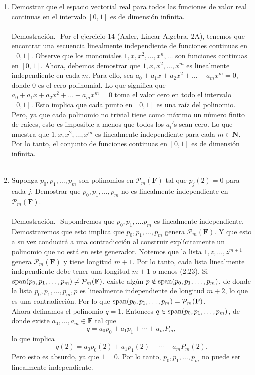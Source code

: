 \begin{enumerate}[\bfseries 1.]
    \item Demostrar que el espacio vectorial real para todos las funciones de valor real continuas en el intervalo $[0,1]$ es de dimensión infinita.\\\\
	Demostración.-\; Por el ejercicio 14 (Axler, Linear Algebra, 2A), tenemos que encontrar una secuencia linealmente independiente de funciones continuas en $[0,1]$. Observe que los monomiales $1,x,x^2,\ldots,x^n,\ldots$ son funciones continuas en $[0,1]$. Ahora, debemos demostrar que $1,x,x^2,\ldots,x^m$ es linealmente independiente en cada $m$. Para ello, sea $a_0+a_1x+a_2x^2+\ldots+a_mx^m=0$, donde $0$ es el cero polinomial. Lo que significa que $a_0+a_1x+a_2x^2+\ldots+a_mx^m=0$ toma el valor cero en todo el intervalo $[0,1]$. Esto implica que cada punto en $[0,1]$ es una raíz del polinomio. Pero, ya que cada polinomio no trivial tiene como máximo un número finito de raíces, esto es imposible a menos que todos los $a_i'$s sean cero. Lo que muestra que $1,x,x^2,\ldots,x^m$ es linealmente independiente para cada $m\in \textbf{N}$. Por lo tanto, el conjunto de funciones continuas en $[0,1]$ es de dimensión infinita.\\\\

    \item Suponga $p_0,p_1,\ldots,p_m$ son polinomios en $\mathcal{P}_m(\textbf{F})$ tal que $p_j(2)=0$ para cada $j$. Demostrar que $p_0,p_1,\ldots,p_m$ no es linealmente independiente en $\mathcal{P}_m(\textbf{F})$.\\\\
	Demostración.-\; Supondremos que $p_0,p_1,\ldots.p_m$ es linealmente independiente. Demostraremos que esto  implica que $p_0,p_1,\ldots,p_m$ genera $\mathcal{P}_m(\textbf{F})$. Y que esto a su vez conducirá a una contradicción al construir explícitamente un polinomio que no está en este generador.
	Notemos que la lista $1,z,\ldots,z^{m+1}$ genera $\mathcal{P}_m(\textbf{F})$ y tiene longitud $m+1$. Por lo tanto, cada lista linealmente independiente debe tener una longitud $m+1$ o menos (2.23). Si $\mathop{\mbox{\normalfont span}}\nolimits(p_0,p_1,\ldots,p_m)\neq \mathcal{P}_m(\textbf{F})$, existe algún $p\notin \mathop{\mbox{\normalfont span}}\nolimits(p_0,p_1,\ldots,p_m)$, de donde la lista $p_0,p_1,\ldots,p_m,p$ es linealmente independiente de longitud $m+2$, lo que es una contradicción. Por lo que $\mathop{\mbox{\normalfont span}}\nolimits(p_0,p_1,\ldots,p_m)=\mathcal{P}_m(\textbf{F})$.\\
	Ahora definamos el polinomio $q=1$. Entonces $q\in \mathop{\mbox{\normalfont span}}\nolimits(p_0,p_1,\ldots,p_m)$, de donde existe $a_0,\ldots,a_m\in \textbf{F}$ tal que
	$$q=a_0p_0+a_1p_1+\cdots+a_mP_m,$$
	lo que implica
	$$q(2)=a_0p_0(2)+a_1p_1(2)+\cdots+a_mP_m(2).$$
	Pero esto es absurdo, ya que $1=0$. Por lo tanto, $p_0,p_1,\ldots,p_m$ no puede ser linealmente independiente.\\\\
\end{enumerate}

